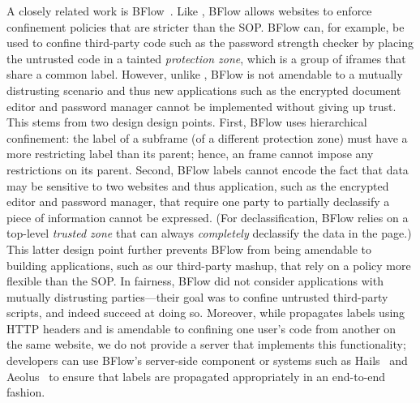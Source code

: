 A closely related work is BFlow~\cite{Yip:2009:PBS}.
%
Like \sys{}, BFlow allows websites to enforce confinement policies
that are stricter than the SOP.
%
BFlow can, for example, be used to confine third-party code such as
the password strength checker by placing the untrusted code in a
tainted \emph{protection zone}, which is a group of iframes that share
a common label.
%
However, unlike \sys{}, BFlow is not amendable to a mutually
distrusting scenario and thus new applications such as the encrypted
document editor and password manager cannot be implemented without
giving up trust.
%
This stems from two design design points.
%
First, BFlow uses hierarchical confinement: the label of a subframe
(of a different protection zone) must have a more restricting label
than its parent; hence, an frame cannot impose any restrictions on its
parent.
%
Second, BFlow labels cannot encode the fact that data may be sensitive
to two websites and thus application, such as the encrypted editor and
password manager, that require one party to partially declassify a
piece of information cannot be expressed.
%
(For declassification, BFlow relies on a top-level \emph{trusted zone}
that can always \emph{completely} declassify the data in the page.)
%
This latter design point further prevents BFlow from being amendable
to building applications, such as our third-party mashup, that rely on
a policy more flexible than the SOP.
%
In fairness, BFlow did not consider applications with mutually
distrusting parties---their goal was to confine untrusted third-party
scripts, and indeed succeed at doing so.
%
Moreover, while \sys{} propagates labels using HTTP headers and is
amendable to confining one user's code from another on the same
website, we do not provide a server that implements this
functionality; developers can use BFlow's server-side component or
systems such as Hails~\cite{giffin:2012:hails} and
Aeolus~\cite{cheng:aeolus} to ensure that labels are propagated
appropriately in an end-to-end fashion.


